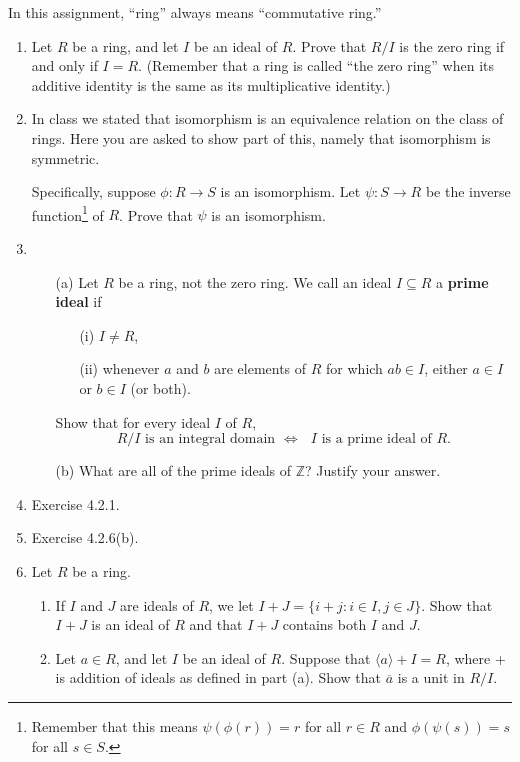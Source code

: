 \documentclass[11pt]{article}
\renewcommand\subset\subseteq
\renewcommand\bar\overline
\theoremstyle{plain}
\theoremstyle{remark}
\begin{document}
\vskip 0.1in
\noindent In this assignment, ``ring'' always means ``commutative ring.''
\begin{enumerate}

\item Let $R$ be a ring, and let $I$ be an ideal of $R$. Prove that $R/I$ is the zero ring if and only if $I=R$. (Remember that a ring is called ``the zero ring'' when its additive identity is the same as its multiplicative identity.)

\item In class we stated that isomorphism is an equivalence relation on the class of rings. Here you are asked to show part of this, namely that isomorphism is symmetric.
    
    Specifically, suppose $\phi\colon R \to S$ is an isomorphism. Let $\psi\colon S \to R$ be the inverse function\footnote{Remember that this means $\psi(\phi(r)) = r$ for all $r \in R$ and $\phi(\psi(s)) = s$ for all $s \in S$.} of $R$. Prove that $\psi$ is an isomorphism.


\item
\begin{enumerate}
\item[(a)] Let $R$ be a ring, not the zero ring. We call an ideal $I \subset R$  a \textbf{prime ideal} if
     \begin{enumerate}
     \item[(i)] $I \ne R$,
     \item[(ii)] whenever $a$ and $b$ are elements of $R$ for which $ab \in I$, either $a \in I$ or $b \in I$ (or both).
     \end{enumerate}
Show that for every ideal $I$ of $R$,
\[ \text{$R/I$ is an integral domain $\Longleftrightarrow$ $I$ is a prime ideal of $R$.} \]
\item[(b)] What are all of the prime ideals of $\mathbb{Z}$? Justify your answer.
\end{enumerate}

\item Exercise 4.2.1.

\item Exercise 4.2.6(b).

\item Let $R$ be a ring.
\begin{enumerate}
	\item If $I$ and $J$ are ideals of $R$, we let $I+J = \{i+j: i \in I, j \in J\}$. Show that $I+J$ is an ideal of $R$ and that $I+J$ contains both $I$ and $J$.
	\item Let $a \in R$, and let $I$ be an ideal of $R$. Suppose that $\langle a\rangle + I = R$, where + is addition of ideals as defined in part (a). Show that $\bar{a}$ is a unit in $R/I$.
\end{enumerate}



\end{enumerate}
\end{document}
